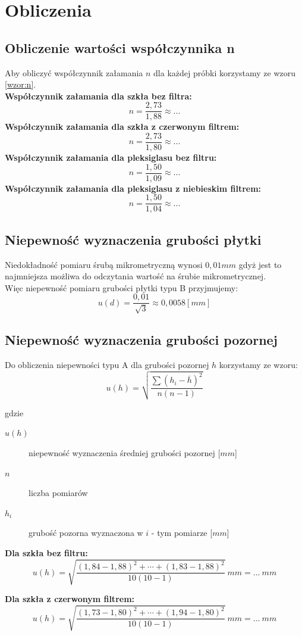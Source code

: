 \documentclass[a4paper,11pt]{article}
\begin{document}
\section{Obliczenia}
\subsection{Obliczenie wartości współczynnika n}
\indent Aby obliczyć współczynnik załamania $n$ dla każdej próbki korzystamy ze wzoru {\ref{wzor:n}}. \\

\textbf{Współczynnik załamania dla szkła bez filtra:}
$$ n = \frac{2,73}{1,88} \approx ... $$
\textbf{Współczynnik załamania dla szkła z czerwonym filtrem:}
$$ n = \frac{2,73}{1,80} \approx ... $$
\textbf{Współczynnik załamania dla pleksiglasu bez filtru:}
$$ n = \frac{1,50}{1,09} \approx ... $$
\textbf{Współczynnik załamania dla pleksiglasu z niebieskim filtrem:}
$$ n = \frac{1,50}{1,04} \approx ... $$

\subsection{Niepewność wyznaczenia grubości płytki}
Niedokładność pomiaru śrubą mikrometryczną wynosi $0,01 mm$ gdyż jest to najmniejsza możliwa do odczytania wartość na śrubie mikrometrycznej.\\
Więc niepewność pomiaru grubości płytki typu B przyjmujemy:
$$u(d)= \frac{0,01}{\sqrt{3}} \approx 0,0058 [mm]$$

\subsection{Niepewność wyznaczenia grubości pozornej}
Do obliczenia niepewności typu A dla grubości pozornej $h$ korzystamy ze wzoru:
$$u(h) = \sqrt{\frac{\sum(h_{i}-\overline{h})^{2}}{n(n-1)}}$$

gdzie 
\begin{description}
\item [$u(h)$] niepewność wyznaczenia średniej grubości pozornej [$mm$]
\item [$n$] liczba pomiarów
\item [$h_{i}$] grubość pozorna wyznaczona w $i$ - tym pomiarze [$mm$]
\end{description}

\textbf{Dla szkła bez filtru:}
$$u(h)=\displaystyle \sqrt{\frac{(1,84-1,88)^{2}+\cdots +(1,83-1,88)^{2}}{10(10-1)}}~mm= ...~mm$$	

\textbf{Dla szkła z czerwonym filtrem:}
$$u(h)=\displaystyle \sqrt{\frac{(1,73-1,80)^{2}+\cdots +(1,94-1,80)^{2}}{10(10-1)}}~mm= ...~mm$$	
\end{document}
